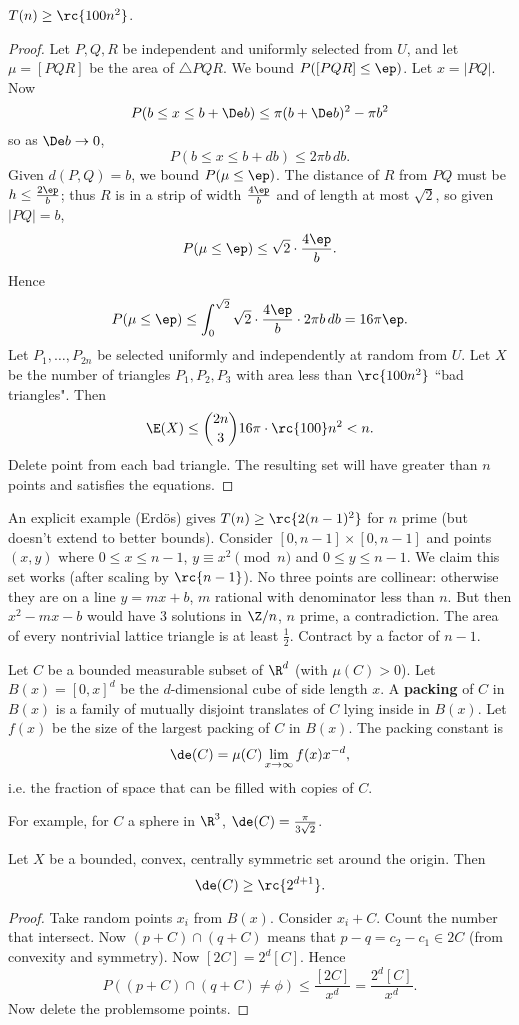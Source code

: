 \begin{thm}
$T(n)\geq \rc{100n^2}$.
\end{thm} 
\begin{proof}
Let $P,Q,R$ be independent and uniformly selected from $U$, and let $\mu=[PQR]$ be the area of $\triangle PQR$. 
We bound $P([PQR]\leq \ep)$. 
Let $x=|PQ|$. Now
\[
P(b\leq x\leq b+\De b)\leq \pi(b+\De b)^2-\pi b^2
\]
so as $\De b\to 0$, 
\[
P(b\leq x\leq b+db)\leq 2\pi b\,db.
\]
Given $d(P,Q)=b$, we bound $P(\mu\leq \ep)$. The distance of $R$ from $PQ$ must be $h\leq \frac{2\ep}{b}$; thus $R$ is in a strip of width $\frac{4\ep}{b}$ and of length at most $\sqrt 2$, so given $|PQ|=b$, 
\[
P(\mu\leq \ep)\leq \sqrt{2}\cdot \frac{4\ep}{b}.
\]
Hence
\[
P(\mu\leq \ep)\leq \int_0^{\sqrt 2}\sqrt 2 \cdot \frac{4\ep}{b}\cdot 2\pi b\,db=16\pi \ep.
\]
Let $P_1,\ldots, P_{2n}$ be selected uniformly and independently at random from $U$. Let $X$ be the number of triangles $P_1,P_2,P_3$ with area less than $\rc{100n^2}$ ``bad triangles". Then
\[
\E(X)\leq \binom{2n}{3}16\pi\cdot\rc{100}n^2<n.
\]
Delete point from each bad triangle. The resulting set will have greater than $n$ points and satisfies the equations.
\end{proof}
An explicit example (Erd\"os) gives $T(n)\geq\rc{2(n-1)^2}$ for $n$ prime (but doesn't extend to better bounds). Consider $[0,n-1]\times [0,n-1]$ and points $(x,y)$ where $0\leq x\leq n-1$, $y\equiv x^2\pmod n$ and $0\leq y\leq n-1$. We claim this set works (after scaling by $\rc{n-1}$).
No three points are collinear: otherwise they are on a line $y=mx+b$, $m$ rational with denominator less than $n$. But then $x^2-mx-b$ would have 3 solutions in $\Z/n$, $n$ prime, a contradiction. The area of every nontrivial lattice triangle is at least $\frac 12$. %
 Contract by a factor of $n-1$.

\begin{df}
Let $C$ be a bounded measurable subset of $\R^d$ (with $\mu(C)>0$). Let $B(x)=[0,x]^d$ be the $d$-dimensional cube of side length $x$. A \textbf{packing} of $C$ in $B(x)$ is a family of mutually disjoint translates of $C$ lying inside in $B(x)$. Let $f(x)$ be the size of the largest packing of $C$ in $B(x)$. The packing constant is
\[
\de(C)=\mu(C)\lim_{x\to \infty} f(x)x^{-d},
\]
i.e. the fraction of space that can be filled with copies of $C$.
\end{df}
For example, for $C$ a sphere in $\R^3$, $\de(C)=\frac{\pi}{3\sqrt 2}$.
\begin{thm}
Let $X$ be a bounded, convex, centrally symmetric set around the origin. Then
\[\de(C)\geq \rc{2^{d+1}}.\]
\end{thm}
\begin{proof}
Take random points $x_i$ from $B(x)$. Consider $x_i+C$. Count the number that intersect. Now $(p+C)\cap (q+C)$ means that $p-q=c_2-c_1\in 2C$ (from convexity and symmetry). Now $[2C]=2^d[C]$. Hence 
\[
P((p+C)\cap (q+C)\neq \phi)\leq \frac{[2C]}{x^d}=\frac{2^d[C]}{x^d}.
\]
Now delete the problemsome points.
\end{proof}
